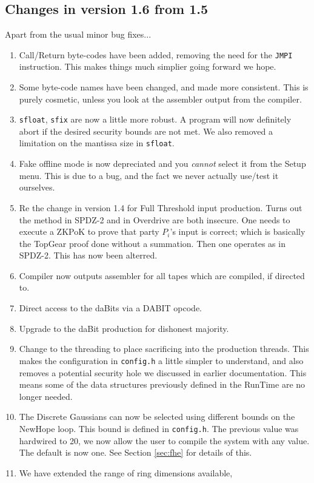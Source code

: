\subsection{Changes in version 1.6 from 1.5}
Apart from the usual minor bug fixes...
\begin{enumerate}
\item Call/Return byte-codes have been added, removing the need for the \verb+JMPI+
instruction. This makes things much simplier going forward we hope.
\item Some byte-code names have been changed, and made more consistent. This
is purely cosmetic, unless you look at the assembler output from the compiler.
\item \verb|sfloat|, \verb|sfix| are now a little more robust. A program will
now definitely abort if the desired security bounds are not met.
We also removed a limitation on the mantissa size in \verb|sfloat|.
\item Fake offline mode is now depreciated and you {\em cannot} select it
from the Setup menu. This is due to a bug, and the fact we never actually
use/test it ourselves.
\item Re the change in version 1.4 for Full Threshold input production.
Turns out the method in SPDZ-2 and in Overdrive are both insecure.
One needs to execute a ZKPoK to prove that party $P_i$'s input is correct;
which is basically the TopGear proof done without a summation. Then
one operates as in SPDZ-2. This has now been alterred.
\item Compiler now outputs assembler for all tapes which are compiled, if
directed to.
\item Direct access to the daBits via a DABIT opcode.
\item Upgrade to the daBit production for dishonest majority.
\item Change to the threading to place sacrificing into the production
threads. This makes the configuration in \verb+config.h+ a little
simpler to understand, and also removes a potential security hole
we discussed in earlier documentation.
This means some of the data structures previously defined in
the RunTime are no longer needed.
\item The Discrete Gaussians can now be selected using different
bounds on the NewHope loop. This bound is defined in \verb|config.h|.
The previous value was hardwired to 20, we now allow the user
to compile the system with any value. The default is now one.
See Section \ref{sec:fhe} for details of this.
\item We have extended the range of ring dimensions available,

\end{enumerate}
